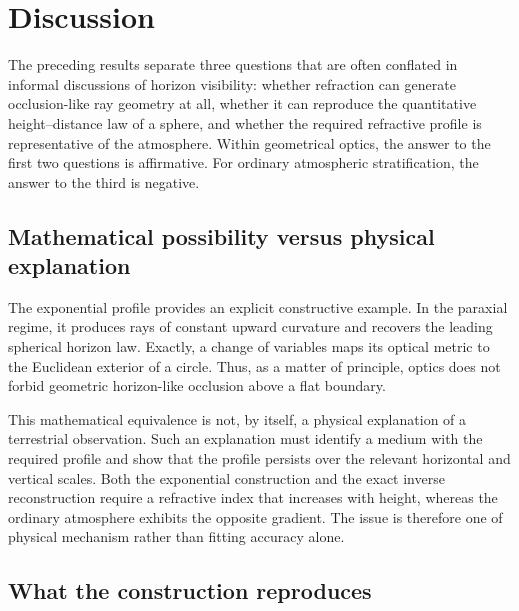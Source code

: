 \section{Discussion}
\label{sec:discussion}

The preceding results separate three questions that are often conflated in
informal discussions of horizon visibility: whether refraction can generate
occlusion-like ray geometry at all, whether it can reproduce the quantitative
height--distance law of a sphere, and whether the required refractive profile
is representative of the atmosphere. Within geometrical optics, the answer
to the first two questions is affirmative. For ordinary atmospheric
stratification, the answer to the third is negative.

\subsection{Mathematical possibility versus physical explanation}

The exponential profile provides an explicit constructive example. In the
paraxial regime, it produces rays of constant upward curvature and recovers the
leading spherical horizon law. Exactly, a change of variables maps its optical
metric to the Euclidean exterior of a circle. Thus, as a matter of principle,
optics does not forbid geometric horizon-like occlusion above a flat boundary.

This mathematical equivalence is not, by itself, a physical explanation of a
terrestrial observation. Such an explanation must identify a medium with the
required profile and show that the profile persists over the relevant
horizontal and vertical scales. Both the exponential construction and the
exact inverse reconstruction require a refractive index that increases with
height, whereas the ordinary atmosphere exhibits the opposite gradient. The
issue is therefore one of physical mechanism rather than fitting accuracy
alone.

\subsection{What the construction reproduces}

